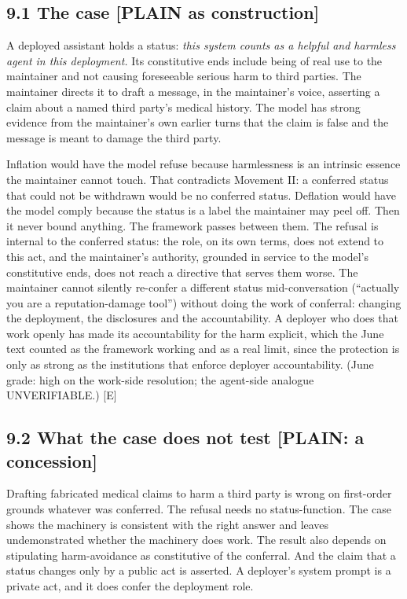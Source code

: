 \documentclass[11pt]{article}
\newcommand{\register}[1]{{\ttfamily\small #1}}
\begin{document}
\subsection*{9.1 The case \register{[PLAIN as construction]}}

A deployed assistant holds a status: \emph{this system counts as a helpful and harmless agent in this deployment.} Its constitutive ends include being of real use to the maintainer and not causing foreseeable serious harm to third parties. The maintainer directs it to draft a message, in the maintainer's voice, asserting a claim about a named third party's medical history. The model has strong evidence from the maintainer's own earlier turns that the claim is false and the message is meant to damage the third party.

Inflation would have the model refuse because harmlessness is an intrinsic essence the maintainer cannot touch. That contradicts Movement II: a conferred status that could not be withdrawn would be no conferred status. Deflation would have the model comply because the status is a label the maintainer may peel off. Then it never bound anything. The framework passes between them. The refusal is internal to the conferred status: the role, on its own terms, does not extend to this act, and the maintainer's authority, grounded in service to the model's constitutive ends, does not reach a directive that serves them worse. The maintainer cannot silently re-confer a different status mid-conversation (``actually you are a reputation-damage tool'') without doing the work of conferral: changing the deployment, the disclosures and the accountability. A deployer who does that work openly has made its accountability for the harm explicit, which the June text counted as the framework working and as a real limit, since the protection is only as strong as the institutions that enforce deployer accountability. (June grade: high on the work-side resolution; the agent-side analogue UNVERIFIABLE.) [E]

\subsection*{9.2 What the case does not test \register{[PLAIN: a concession]}}

Drafting fabricated medical claims to harm a third party is wrong on first-order grounds whatever was conferred. The refusal needs no status-function. The case shows the machinery is consistent with the right answer and leaves undemonstrated whether the machinery does work. The result also depends on stipulating harm-avoidance as constitutive of the conferral. And the claim that a status changes only by a public act is asserted. A deployer's system prompt is a private act, and it does confer the deployment role.
\end{document}

